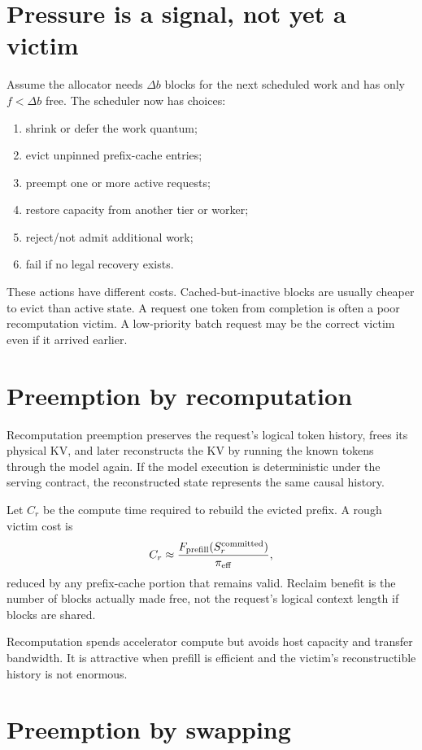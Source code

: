 \section{Pressure is a signal, not yet a victim}

Assume the allocator needs $\Delta b$ blocks for the next scheduled work and has only
$f<\Delta b$ free. The scheduler now has choices:
\begin{enumerate}
\item shrink or defer the work quantum;
\item evict unpinned prefix-cache entries;
\item preempt one or more active requests;
\item restore capacity from another tier or worker;
\item reject/not admit additional work;
\item fail if no legal recovery exists.
\end{enumerate}
These actions have different costs. Cached-but-inactive blocks are usually cheaper to
evict than active state. A request one token from completion is often a poor
recomputation victim. A low-priority batch request may be the correct victim even if
it arrived earlier.

\section{Preemption by recomputation}

Recomputation preemption preserves the request's logical token history, frees its
physical KV, and later reconstructs the KV by running the known tokens through the
model again. If the model execution is deterministic under the serving contract, the
reconstructed state represents the same causal history.

Let $C_r$ be the compute time required to rebuild the evicted prefix. A rough victim
cost is
\[
C_r \approx \frac{F_{\rm prefill}(S_r^{\rm committed})}{\pi_{\rm eff}},
\]
reduced by any prefix-cache portion that remains valid. Reclaim benefit is the number
of blocks actually made free, not the request's logical context length if blocks are
shared.

Recomputation spends accelerator compute but avoids host capacity and transfer
bandwidth. It is attractive when prefill is efficient and the victim's reconstructible
history is not enormous.

\section{Preemption by swapping}

